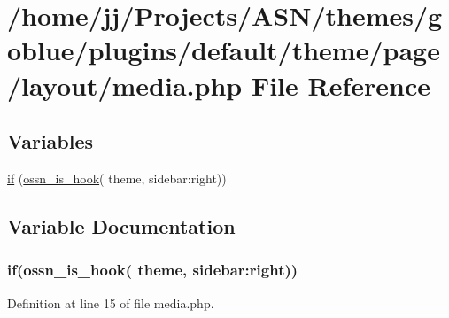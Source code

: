 \hypertarget{media_8php}{}\section{/home/jj/\+Projects/\+A\+S\+N/themes/goblue/plugins/default/theme/page/layout/media.php File Reference}
\label{media_8php}
\subsection*{Variables}
\begin{DoxyCompactItemize}
\item 
\hyperlink{media_8php_a642d7b3df8557ae6c5b50d74cca565b6}{if} (\hyperlink{ossn_8lib_8system_8php_ae29c30c131d7600928d7a2fc28bcd322}{ossn\+\_\+is\+\_\+hook}( \textquotesingle{}theme\textquotesingle{}, \textquotesingle{}sidebar\+:right\textquotesingle{}))
\end{DoxyCompactItemize}


\subsection{Variable Documentation}
\subsubsection[{\texorpdfstring{if}{if}}]{\setlength{\rightskip}{0pt plus 5cm}if({\bf ossn\+\_\+is\+\_\+hook}( \textquotesingle{}theme\textquotesingle{}, \textquotesingle{}sidebar\+:right\textquotesingle{}))}\hypertarget{media_8php_a642d7b3df8557ae6c5b50d74cca565b6}{}\label{media_8php_a642d7b3df8557ae6c5b50d74cca565b6}


Definition at line 15 of file media.\+php.

